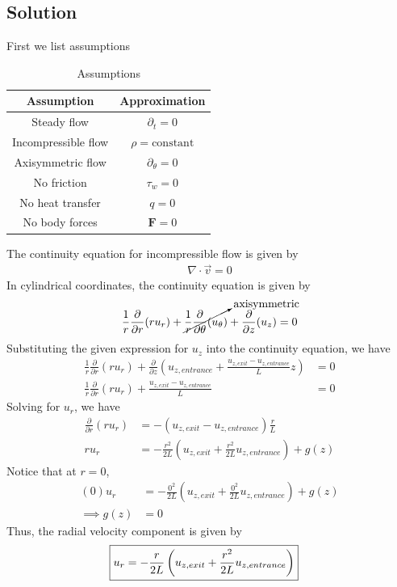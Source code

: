 \subsection*{Solution}
First we list assumptions
\begin{table}[h]
    \centering
    \caption{Assumptions}
    \begin{tabular}{c|c}
        Assumption & Approximation \\
        \hline
        Steady flow & $\partial_t = 0$ \\
        Incompressible flow & $\rho = \text{constant}$ \\
        Axisymmetric flow & $\partial_{\theta} = 0$ \\
        No friction & $\tau_{w} = 0$ \\
        No heat transfer & $q = 0$ \\
        No body forces & $\mathbf{F} = 0$ \\
    \end{tabular}
\end{table}
The continuity equation for incompressible flow is given by
\begin{align*}
    \nabla \cdot \vec{v} = 0
\end{align*}
In cylindrical coordinates, the continuity equation is given by
\begin{align*}
    \frac{1}{r} \frac{\partial}{\partial r}(r u_r) + \cancelto{\text{axisymmetric}}{\frac{1}{r}\frac{\partial}{\partial \theta}(u_{\theta})} + \frac{\partial}{\partial z}(u_z) &= 0 \\
\end{align*}
Substituting the given expression for $u_z$ into the continuity equation, we have
\begin{align*}
    \frac{1}{r} \frac{\partial}{\partial r}(r u_r) + \frac{\partial}{\partial z}\left(u_{z,entrance} + \frac{u_{z,exit} - u_{z,entrance}}{L}z\right) &= 0 \\
    \frac{1}{r} \frac{\partial}{\partial r}(r u_r) + \frac{u_{z,exit} - u_{z,entrance}}{L} &= 0 
\end{align*}
Solving for $u_r$, we have
\begin{align*}
    \frac{\partial}{\partial r}(r u_r) &= -\left(u_{z,exit} - u_{z,entrance}\right)\frac{r}{L} \\
    r u_r &= -\frac{r^2}{2L}\left(u_{z,exit} + \frac{r^2}{2L}u_{z,entrance}\right) + g(z) 
\end{align*}
Notice that at $r=0$, 
\begin{align*}
    (0)u_r &= -\frac{0^2}{2L}\left(u_{z,exit} + \frac{0^2}{2L}u_{z,entrance}\right) + g(z) \\
    \implies g(z) &= 0
\end{align*}
Thus, the radial velocity component is given by
\begin{align*}
    \Aboxed{u_r &= -\frac{r}{2L}\left(u_{z,exit} + \frac{r^2}{2L}u_{z,entrance}\right)}
\end{align*}
